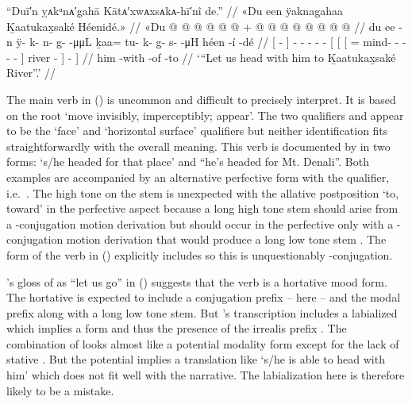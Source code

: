\ex\label{ex:100-45-take-him-to-khaatukaxhsake}%
%
\begingl
	\glpreamble	“Duī′n ỵᴀkᵘnᴀ′g̣ahā Kātᴀ′xwᴀxsᴀkᴀ-hī′nî de.” //
	\glpreamble	«\!Du een ÿaknag̱ahaa Ḵaatukax̱saké Héenidé.\!» //
	\gla	{} «\!Du  @ {} {}
		 @ {} @ {} @ {} @ {} @ {} +
		{} {} {}  @ {} @ {} @ {} @ {} @ {} @ {} @ {} {}
			 @ {} {} {} {} {} //
	\glb	{} \pqp{}du ee -n {} 
		ÿ- k- n- g̱-  -μμL
		{} {} {} ḵaa= tu- k- {} g̱- s-  -μH {}
			héen -í {} -dé {} //
	\glc	{}[ \pqp{}  - {}]
		\xx{qual}- - - -  -
		{}[ {}[
			{}[ = mind- - \· - -  - {}]
			river - {}] - {}] //
	\gld	{} \pqp{}him {} -with {}
		 {} {} {} {} {}
		{} {} {}  {} {} {} {} {} {} {} {}
			 -of {} -to {} //
	\glft	‘“Let us head with him to Ḵaatukax̱saké River”.’
		//
\endgl
\xe

The main verb  in (\lastx) is uncommon and difficult to precisely interpret.
It is based on the root  ‘move invisibly, imperceptibly; appear’.
The two qualifiers  and  appear to be the ‘face’ and ‘horizontal surface’ qualifiers but neither identification fits straightforwardly with the overall meaning.
This verb is documented by \textcite[19]{leer:1976} in two forms:  ‘s/he headed for that place’ and  “he’s headed for Mt.
Denali”.
Both examples are accompanied by an alternative perfective form with the  qualifier, i.e.\ .
The high tone on the stem is unexpected with the allative postposition  ‘to, toward’ in the perfective aspect because a long high tone  stem  should arise from a -conjugation motion derivation but  should occur in the perfective only with a -conjugation motion derivation that would produce a long low tone  stem .
The form of the verb in (\lastx) explicitly includes  so this is unquestionably -conjugation.

\citeauthor{swanton:1909}’s gloss of  as “let us go” in (\lastx) suggests that the verb  is a hortative mood form.
The hortative is expected to include a conjugation prefix – here  – and the modal  prefix along with a long low tone  stem.
But \citeauthor{swanton:1909}’s transcription includes a labialized  which implies a form  and thus the presence of the irrealis prefix .
The combination of  looks almost like a potential modality form except for the lack of stative .
But the potential implies a translation like ‘s/he is able to head with him’ which does not fit well with the narrative.
The labialization here is therefore likely to be a mistake.

